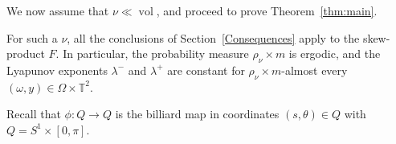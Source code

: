 \documentclass[a4paper,12pt,reqno]{amsart}
\numberwithin{equation}{section}
\newcommand{\Tt}{{\mathbb{T}}}
\def\supp{\operatorname{supp}}
\begin{document}
%





We now assume that $\nu \ll \operatorname{vol}$, and proceed to prove Theorem~\ref{thm:main}.

For such a $\nu$, all the conclusions of Section~\ref{Consequences} apply to the skew-product $F$. In particular, the probability measure $\rho_\nu \times m$ is ergodic, and the Lyapunov exponents $\lambda^-$ and $\lambda^+$ are constant for $\rho_\nu \times m$-almost every $(\omega, y) \in \Omega \times \Tt^2$. 

Recall that $\phi\colon Q\to Q$ is the billiard map in coordinates $(s,\theta) \in Q$ with $Q = S^1 \times [0,\pi]$.
\end{document}
